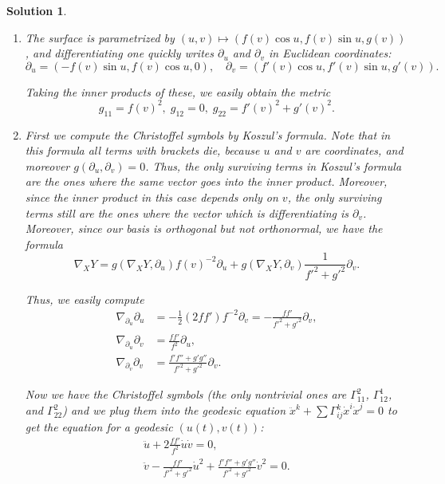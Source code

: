 \documentclass{article}
\theoremstyle{plain}
\theoremstyle{nonumberplain}
\newtheorem{sol}{Solution}
\begin{document}
\begin{sol}
\leavevmode
\begin{enumerate}
\item The surface is parametrized by $(u,v) \mapsto (f(v) \cos u, f(v) \sin u, g(v))$, and differentiating one quickly writes $\partial_u$ and $\partial_v$ in Euclidean coordinates:
\begin{equation}
\partial_u = (-f(v) \sin u, f(v) \cos u, 0),\quad \partial_v = (f'(v) \cos u, f'(v) \sin u, g'(v)).
\end{equation}

Taking the inner products of these, we easily obtain the metric
\begin{equation}
g_{11} = f(v)^2, \; g_{12} = 0, \; g_{22} = f'(v)^2 + g'(v)^2.
\end{equation}

\item First we compute the Christoffel symbols by Koszul's formula. Note that in this formula all terms with brackets die, because $u$ and $v$ are coordinates, and moreover $g(\partial_u,\partial_v) = 0$. Thus, the only surviving terms in Koszul's formula are the ones where the same vector goes into the inner product. Moreover, since the inner product in this case depends only on $v$, the only surviving terms still are the ones where the vector which is differentiating is $\partial_v$. Moreover, since our basis is orthogonal but not orthonormal, we have the formula
\begin{equation}
\nabla_X Y = g(\nabla_X Y, \partial_u) f(v)^{-2} \partial_u + g(\nabla_X Y, \partial_v) \frac1{f'^2 + g'^2} \partial_v.
\end{equation}

Thus, we easily compute
\begin{equation}
\begin{aligned}
\nabla_{\partial_u} \partial_u &= -\frac12 (2 f f') f^{-2} \partial_v = - \frac{ff'}{f'^2 + g'^2} \partial_v, \\
\nabla_{\partial_u} \partial_v &= \frac{ff'}{f^2} \partial_u,\\
\nabla_{\partial_v} \partial_v &= \frac{f' f'' + g' g''}{f'^2 + g'^2} \partial_v.
\end{aligned}
\end{equation}

Now we have the Christoffel symbols (the only nontrivial ones are $\Gamma_{11}^2$, $\Gamma_{12}^1$, and $\Gamma_{22}^2$) and we plug them into the geodesic equation $\ddot x^k + \sum \Gamma_{ij}^k \dot x^i \dot x^j = 0$ to get the equation for a geodesic $(u(t), v(t))$:
\begin{equation}
\begin{gathered}
\ddot u + 2 \frac{ff'}{f^2} \dot u \dot v = 0,\\
\ddot v - \frac{ff'}{f'^2 + g'^2} \dot u^2 + \frac{f' f'' + g' g''}{f'^2 + g'^2} \dot v^2 = 0.
\end{gathered}
\end{equation}


\end{enumerate}
\end{sol}
\end{document}
